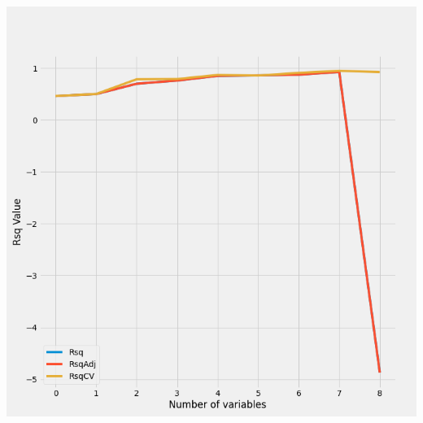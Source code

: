 \documentclass{article}
\begin{document}
	\includegraphics[scale = 0.2]{../plots/python/Stepwise4L.png}
	
\end{document}
